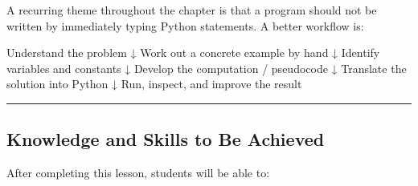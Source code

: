 \documentclass[
]{article}
\newenvironment{Shaded}{\begin{snugshade}}{\end{snugshade}}
\newcommand{\NormalTok}[1]{#1}
\begin{document}
A recurring theme throughout the chapter is that a program should not be
written by immediately typing Python statements. A better workflow is:

\begin{Shaded}
\begin{Highlighting}[]
\NormalTok{Understand the problem}
\NormalTok{        ↓}
\NormalTok{Work out a concrete example by hand}
\NormalTok{        ↓}
\NormalTok{Identify variables and constants}
\NormalTok{        ↓}
\NormalTok{Develop the computation / pseudocode}
\NormalTok{        ↓}
\NormalTok{Translate the solution into Python}
\NormalTok{        ↓}
\NormalTok{Run, inspect, and improve the result}
\end{Highlighting}
\end{Shaded}

\begin{center}\rule{0.5\linewidth}{0.5pt}\end{center}

\subsection{Knowledge and Skills to Be
Achieved}\label{knowledge-and-skills-to-be-achieved}

After completing this lesson, students will be able to:
\end{document}
